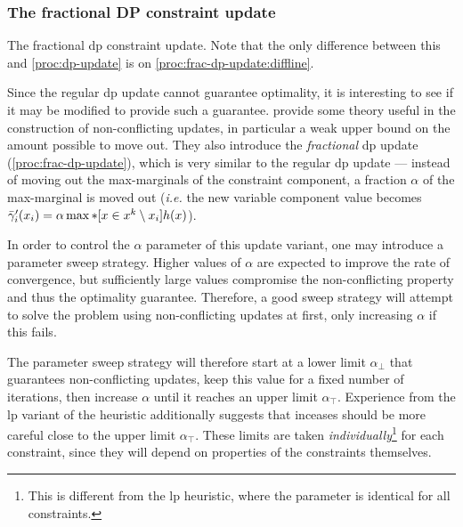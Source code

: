 \subsubsection{The fractional DP constraint update}
\begin{algorithm}[t]

	\caption{
		The fractional \gls{dp} constraint update. Note that the only difference between this and \cref{proc:dp-update} is on \cref{proc:frac-dp-update:diffline}.
	}
	\label{proc:frac-dp-update}
\end{algorithm}
Since the regular \gls{dp} update cannot guarantee optimality, it is interesting to see if it may be modified to provide such a guarantee.
\Textcite[\pno~105\psqq]{Wedelin08} provide some theory useful in the construction of non-conflicting updates, in particular a weak upper bound on the amount possible to move out.
They also introduce the \emph{fractional} \gls{dp} update (\cref{proc:frac-dp-update}), which is very similar to the regular \gls{dp} update --- instead of moving out the max-marginals of the constraint component, a fraction \(\alpha\) of the max-marginal is moved out (\emph{i.e.} the new variable component value becomes \(\bar{\gamma}'_i(x_i) = \alpha\max*[x\in x^k\setminus x_i]{h(x)}\)).

In order to control the \(\alpha\) parameter of this update variant, one may introduce a parameter sweep strategy.
Higher values of \(\alpha\) are expected to improve the rate of convergence, but sufficiently large values compromise the non-conflicting property and thus the optimality guarantee.
Therefore, a good sweep strategy will attempt to solve the problem using non-conflicting updates at first, only increasing \(\alpha\) if this fails.

The parameter sweep strategy will therefore start at a lower limit \(\alpha_\perp\) that guarantees non-conflicting updates, keep this value for a fixed number of iterations, then increase \(\alpha\) until it reaches an upper limit \(\alpha_\top\).
Experience from the \gls{lp} variant of the heuristic additionally suggests that inceases should be more careful close to the upper limit \(\alpha_\top\).
These limits are taken \emph{individually}\footnote{This is different from the \gls{lp} heuristic, where the parameter is identical for all constraints.} for each constraint, since they will depend on properties of the constraints themselves.

